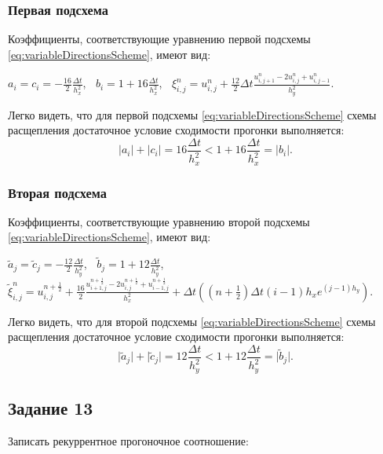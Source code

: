 \documentclass[12pt, a4paper]{report}
\begin{document}
	\subsubsection*{Первая подсхема}
	\large
	Коэффициенты, соответствующие уравнению первой подсхемы \eqref{eq:variableDirectionsScheme}, имеют вид:
	\small
	\begin{center}
		$a_{i}=c_{i}=-\frac{16}{2}\frac{\Delta t}{h_{x}^{2}}$, $\>$ $b_{i}=1 + 16\frac{\Delta t}{h_{x}^{2}}$, $\>$ $\xi_{i, j}^{n}=u_{i, j}^{n} + \frac{12}{2}\Delta t\frac{u_{i, j+1}^{n} - 2u_{i, j}^{n} + u_{i, j-1}^{n}}{h_{y}^{2}}$.
	\end{center}
	\par
	\large
	Легко видеть, что для первой подсхемы \eqref{eq:variableDirectionsScheme} схемы расщепления достаточное условие сходимости прогонки выполняется:
	\begin{equation*}
		\lvert a_{i} \rvert + \lvert c_{i} \rvert = 16\frac{\Delta t}{h_{x}^{2}} < 1 + 16\frac{\Delta t}{h_{x}^{2}} = \lvert b_{i} \rvert.
	\end{equation*}
	\subsubsection*{Вторая подсхема}
	\large
	Коэффициенты, соответствующие уравнению второй подсхемы \eqref{eq:variableDirectionsScheme}, имеют вид:
	\small
	\begin{center}
		$\tilde{a}_{j}=\tilde{c}_{j}=-\frac{12}{2}\frac{\Delta t}{h_{y}^{2}}$, $\>$ $\tilde{b}_{j}=1 + 12\frac{\Delta t}{h_{y}^{2}}$, $\>$ $\tilde{\xi}_{i, j}^{n}=u_{i, j}^{n+\frac{1}{2}} + \frac{16}{2}\frac{u_{i+1, j}^{n+\frac{1}{2}} - 2u_{i, j}^{n+\frac{1}{2}} + u_{i-1, j}^{n+\frac{1}{2}}}{h_{x}^{2}} + \Delta t((n+\frac{1}{2})\Delta t(i-1)h_{x}e^{(j-1)h_{y}})$.
	\end{center}
	\par
	\large
	Легко видеть, что для второй подсхемы \eqref{eq:variableDirectionsScheme} схемы расщепления достаточное условие сходимости прогонки выполняется:
	\begin{equation*}
		\lvert \tilde{a}_{j} \rvert + \lvert \tilde{c}_{j} \rvert = 12\frac{\Delta t}{h_{y}^{2}} < 1 + 12\frac{\Delta t}{h_{y}^{2}} = \lvert \tilde{b}_{j} \rvert.
	\end{equation*}

	\subsection*{Задание 13}
	\large
	Записать рекуррентное прогоночное соотношение:
\end{document}
